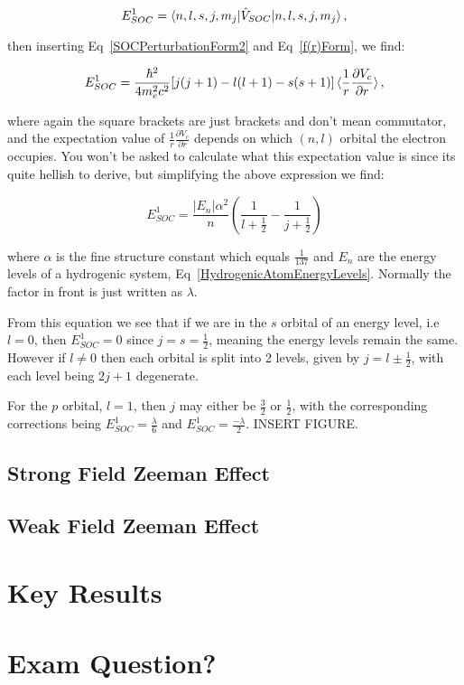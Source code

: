 \begin{equation}
    E^1_{SOC} = \braket{n, l, s, j, m_j | \Hat{V}_{SOC} | n, l, s, j, m_j},
    \label{FirstOrderEnergySOC}
\end{equation}

\noindent then inserting Eq~\ref{SOCPerturbationForm2} and Eq~\ref{f(r)Form}, we find:

\begin{equation}
    E^1_{SOC} = \frac{\hbar^2}{4m^2_ec^2}[j(j + 1) -l(l + 1) - s(s + 1)] \braket{\frac{1}{r}\frac{\partial V_c}{\partial r}},
    \label{FirstOrderEnergySOCForm1}
\end{equation}

\noindent where again the square brackets are just brackets and don't mean commutator, and the expectation value of $\frac{1}{r} \frac{\partial V_c}{\partial r}$ depends on which $(n,l)$ orbital the electron occupies. You won't be asked to calculate what this expectation value is since its quite hellish to derive, but simplifying the above expression we find:

\begin{equation}
    E^1_{SOC} = \frac{|E_n| \alpha^2}{n}(\frac{1}{l + \frac{1}{2}} - \frac{1}{j + \frac{1}{2}})
    \label{FirstOrderEnergySOCForm2}
\end{equation}

\noindent where $\alpha$ is the fine structure constant which equals $\frac{1}{137}$ and $E_n$ are the energy levels of a hydrogenic system, Eq~\ref{HydrogenicAtomEnergyLevels}. Normally the factor in front is just written as $\lambda$.

\noindent From this equation we see that if we are in the $s$ orbital of an energy level, i.e $l = 0$, then $E^1_{SOC} = 0$ since $j = s = \frac{1}{2}$, meaning the energy levels remain the same. However if $l \neq 0$ then each orbital is split into 2 levels, given by $j = l \pm \frac{1}{2}$, with each level being $2j + 1$ degenerate.

\noindent For the $p$ orbital, $l = 1$, then $j$ may either be $\frac{3}{2}$ or $\frac{1}{2}$, with the corresponding corrections being $E^1_{SOC} = \frac{\lambda}{6}$ and $E^1_{SOC} = \frac{-\lambda}{2}$. INSERT FIGURE.

\subsection{Strong Field Zeeman Effect}




\subsection{Weak Field Zeeman Effect}




\section{Key Results}





\section{Exam Question?}


